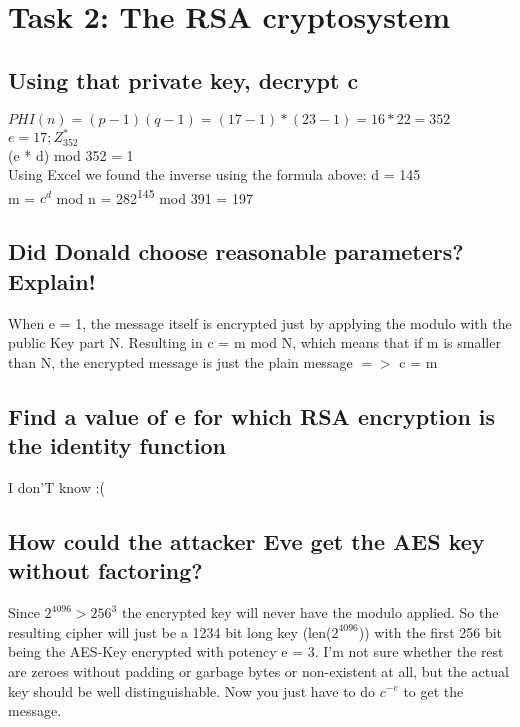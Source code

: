 \section{Task 2: The RSA cryptosystem}


\subsection{Using that private key, decrypt c}

$PHI(n) = (p-1)(q-1) = (17 - 1) * (23 - 1) = 16 * 22 = 352$\\

$e = 17; Z^*_{352}$\\
(e * d) mod 352 = 1\\

Using Excel we found the inverse using the formula above: d = 145\\

m = $c^d$ mod n = 282\textsuperscript{145} mod 391 = 197

\subsection{Did Donald choose reasonable parameters? Explain!}

When e = 1, the message itself is encrypted just by applying the modulo with the public Key part N. Resulting in c = m mod N, which means that if m is smaller than N, the encrypted message is just the plain message $=>$ c = m
 
\subsection{Find a value of e for which RSA encryption is the identity function}

I don'T know :(

\subsection{How could the attacker Eve get the AES key without factoring?}

Since $2^{4096} > 256^3$ the encrypted key will never have the modulo applied.
So the resulting cipher will just be a 1234 bit long key (len($2^{4096}$)) with the first 256 bit being the AES-Key encrypted with potency e = 3. I'm not sure whether the rest are zeroes without padding or garbage bytes or non-existent at all, but the actual key should be well distinguishable. Now you just have to do $c^{-e}$ to get the message.

